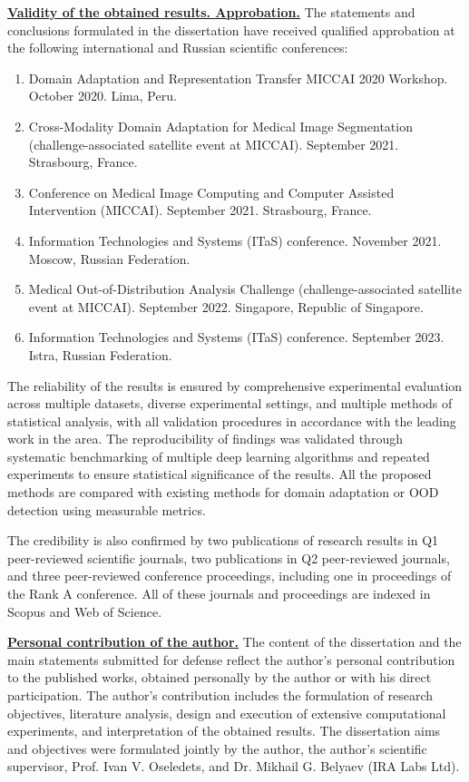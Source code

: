 \underline{\textbf{Validity of the obtained results. Approbation.}} The statements and conclusions formulated in the dissertation have received qualified approbation at the following international and Russian scientific conferences:

\begin{enumerate}
	\item Domain Adaptation and Representation Transfer MICCAI 2020 Workshop. October 2020. Lima, Peru.
	\item Cross-Modality Domain Adaptation for Medical Image Segmentation (challenge-associated satellite event at MICCAI). September 2021. Strasbourg, France.
	\item Conference on Medical Image Computing and Computer Assisted Intervention (MICCAI). September 2021. Strasbourg, France.
	\item Information Technologies and Systems (ITaS) conference. November 2021. Moscow, Russian Federation.
	\item Medical Out-of-Distribution Analysis Challenge (challenge-associated satellite event at MICCAI). September 2022. Singapore, Republic of Singapore. 
	\item Information Technologies and Systems (ITaS) conference. September 2023. Istra, Russian Federation.
\end{enumerate}

The reliability of the results is ensured by comprehensive experimental evaluation across multiple datasets, diverse experimental settings, and multiple methods of statistical analysis, with all validation procedures in accordance with the leading work in the area. The reproducibility of findings was validated through systematic benchmarking of multiple deep learning algorithms and repeated experiments to ensure statistical significance of the results. All the proposed methods are compared with existing methods for domain adaptation or OOD detection using measurable metrics.

The credibility is also confirmed by two publications of research results in Q1 peer-reviewed scientific journals, two publications in Q2 peer-reviewed journals, and three peer-reviewed conference proceedings, including one in proceedings of the Rank A conference. All of these journals and proceedings are indexed in Scopus and Web of Science.


\underline{\textbf{Personal contribution of the author.}}
The content of the dissertation and the main statements submitted for defense reflect the author’s personal contribution to the published works, obtained personally by the author or with his direct participation. The author’s contribution includes the formulation of research objectives, literature analysis, design and execution of extensive computational experiments, and interpretation of the obtained results. The dissertation aims and objectives were formulated jointly by the author, the author’s scientific supervisor, Prof. Ivan V. Oseledets, and Dr. Mikhail G. Belyaev (IRA Labs Ltd).

